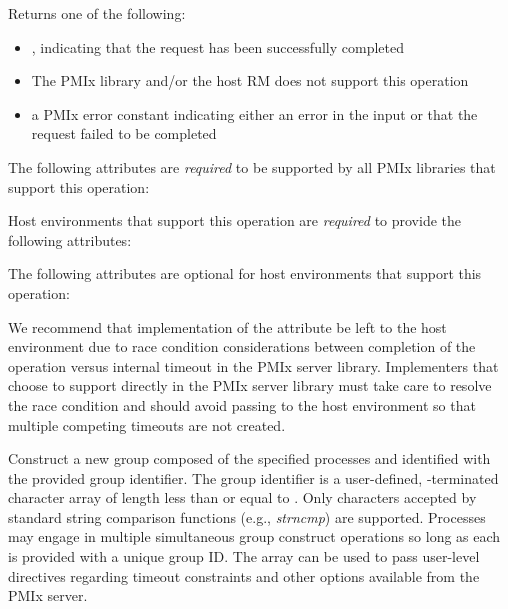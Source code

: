 Returns one of the following:

\begin{itemize}
    \item {}, indicating that the request has been successfully completed
    \item {} The \ac{PMIx} library and/or the host \ac{RM} does not support this operation
    \item a \ac{PMIx} error constant indicating either an error in the input or that the request failed to be completed
\end{itemize}

\reqattrstart
The following attributes are \textit{required} to be supported by all \ac{PMIx} libraries that support this operation:


Host environments that support this operation are \textit{required} to provide the following attributes:


\reqattrend

\optattrstart
The following attributes are optional for host environments that support this operation:


\optattrend

\adviceimplstart
We recommend that implementation of the  attribute be left to the host environment due to race condition considerations between completion of the operation versus internal timeout in the \ac{PMIx} server library. Implementers that choose to support  directly in the \ac{PMIx} server library must take care to resolve the race condition and should avoid passing  to the host environment so that multiple competing timeouts are not created.
\adviceimplend


\descr

Construct a new group composed of the specified processes and identified with the provided group identifier. The group identifier is a user-defined, -terminated character array of length less than or equal to . Only characters accepted by standard string comparison functions (e.g., \emph{strncmp}) are supported. Processes may engage in multiple simultaneous group construct operations so long as each is provided with a unique group ID. The  array can be used to pass user-level directives regarding timeout constraints and other options available from the \ac{PMIx} server.

